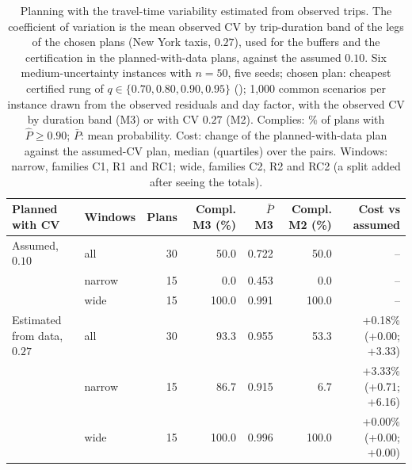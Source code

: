 \begin{table}[htbp]
\centering
\caption{Planning with the travel-time variability estimated from observed trips. The coefficient of variation is the mean observed CV by trip-duration band of the legs of the chosen plans (New York taxis, $0.27$), used for the buffers and the certification in the planned-with-data plans, against the assumed $0.10$. Six medium-uncertainty instances with $n=50$, five seeds; chosen plan: cheapest certified rung of $q\in\{0.70,0.80,0.90,0.95\}$ (\mCAL{}); 1{,}000 common scenarios per instance drawn from the observed residuals and day factor, with the observed CV by duration band (M3) or with CV $0.27$ (M2). Complies: \% of plans with $\hat P\ge0.90$; $\bar P$: mean probability. Cost: change of the planned-with-data plan against the assumed-CV plan, median (quartiles) over the pairs. Windows: narrow, families C1, R1 and RC1; wide, families C2, R2 and RC2 (a split added after seeing the totals).}
\label{tab:b4}
\footnotesize\setlength{\tabcolsep}{3pt}
\begin{tabular}{@{}l l r r r r r@{}}
\toprule
Planned with CV & Windows & Plans & Compl. M3 (\%) & $\bar P$ M3 & Compl. M2 (\%) & Cost vs assumed \\
\midrule
Assumed, $0.10$ & all & 30 & 50.0 & 0.722 & 50.0 & -- \\
 & narrow & 15 & 0.0 & 0.453 & 0.0 & -- \\
 & wide & 15 & 100.0 & 0.991 & 100.0 & -- \\
\midrule
Estimated from data, $0.27$ & all & 30 & 93.3 & 0.955 & 53.3 & +0.18\% (+0.00; +3.33) \\
 & narrow & 15 & 86.7 & 0.915 & 6.7 & +3.33\% (+0.71; +6.16) \\
 & wide & 15 & 100.0 & 0.996 & 100.0 & +0.00\% (+0.00; +0.00) \\
\bottomrule
\end{tabular}
\end{table}

